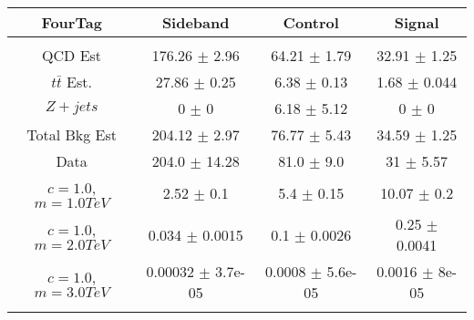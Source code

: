\begin{footnotesize} 
\begin{tabular}{c|c|c|c} 
FourTag & Sideband & Control & Signal \\ 
\hline\hline 
& & & \\ 
QCD Est & 176.26 $\pm$ 2.96 & 64.21 $\pm$ 1.79 & 32.91 $\pm$ 1.25\\ 
$t\bar{t}$ Est.  & 27.86 $\pm$ 0.25 & 6.38 $\pm$ 0.13 & 1.68 $\pm$ 0.044\\ 
$Z+jets$ & 0 $\pm$ 0 & 6.18 $\pm$ 5.12 & 0 $\pm$ 0\\ 
Total Bkg Est & 204.12 $\pm$ 2.97 & 76.77 $\pm$ 5.43 & 34.59 $\pm$ 1.25\\ 
Data & 204.0 $\pm$ 14.28 & 81.0 $\pm$ 9.0 & 31 $\pm$ 5.57 \\ 
$c=1.0$,$m=1.0TeV$ & 2.52 $\pm$ 0.1 & 5.4 $\pm$ 0.15 & 10.07 $\pm$ 0.2\\ 
$c=1.0$,$m=2.0TeV$ & 0.034 $\pm$ 0.0015 & 0.1 $\pm$ 0.0026 & 0.25 $\pm$ 0.0041\\ 
$c=1.0$,$m=3.0TeV$ & 0.00032 $\pm$ 3.7e-05 & 0.0008 $\pm$ 5.6e-05 & 0.0016 $\pm$ 8e-05\\ 
& & & \\ 
\hline\hline 
\end{tabular} 
\end{footnotesize} 
\newline 
